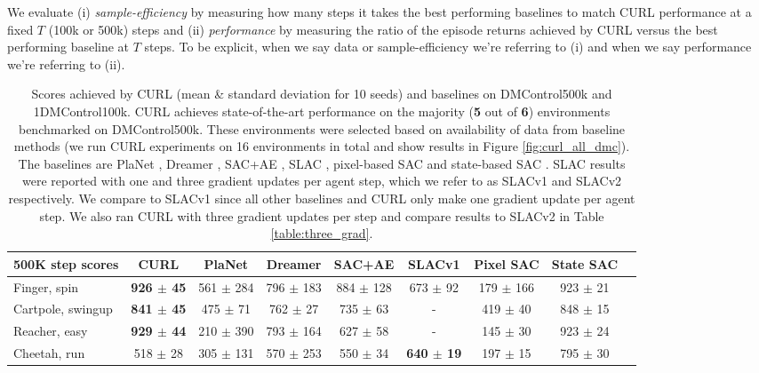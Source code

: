 \documentclass{article}
\begin{document}
We evaluate (i) \textit{sample-efficiency} by measuring how many steps it takes the best performing baselines to match CURL performance at a fixed $T$ (100k or 500k) steps and (ii) \textit{performance} by measuring the ratio of the episode returns achieved by CURL versus the best performing baseline at $T$ steps. To be explicit, when we say data or sample-efficiency we're referring to (i) and when we say performance we're referring to (ii).

\begin{table*}[ht]
\caption{Scores achieved by CURL (mean \& standard deviation for 10 seeds) and baselines on DMControl500k and 1DMControl100k. CURL achieves state-of-the-art performance on the majority (\textbf{5} out of \textbf{6}) environments benchmarked on DMControl500k. These environments were selected based on availability of data from baseline methods (we run CURL experiments on 16 environments in total and show results in Figure \ref{fig:curl_all_dmc}). The baselines are PlaNet \cite{hafner2018learning}, Dreamer \cite{hafner2019dream}, SAC+AE \cite{yarats2019improving}, SLAC \cite{lee2019stochastic}, pixel-based SAC and state-based SAC \cite{haarnoja2018soft}. SLAC results were reported with one and three gradient updates per agent step, which we refer to as SLACv1 and SLACv2 respectively. We compare to SLACv1 since all other baselines and CURL only make one gradient update per agent step. We also ran CURL with three gradient updates per step and compare results to SLACv2 in Table \ref{table:three_grad}.}
\label{table:500kscores}
\vskip 0.15in
\begin{center}
\begin{small}
\begin{sc}
\begin{tabular}{lcccccccc}
\toprule
500K step scores & CURL & PlaNet & Dreamer & SAC+AE & SLACv1 & Pixel SAC &  State SAC \\
\midrule
Finger, spin    & \textbf{ 926 $\pm$ 45} & 561 $\pm$ 284 & 796 $\pm$ 183  & 884 $\pm$ 128 &   673 $\pm$ 92 & 179 $\pm$ 166  & 923 $\pm$ 21 \\
Cartpole, swingup & \textbf{841 $\pm$ 45}& 475 $\pm$ 71& 762 $\pm$ 27 & 735 $\pm$ 63 & - & 419 $\pm$ 40 &  848 $\pm$ 15 \\
Reacher, easy    & \textbf{929 $\pm$ 44}& 210 $\pm$ 390& 793 $\pm$ 164 & 627 $\pm$ 58 & - & 145 $\pm$ 30 &  923 $\pm$ 24 \\
Cheetah, run   & 518 $\pm$ 28 & 305 $\pm$ 131& 570 $\pm$ 253 & 550 $\pm$ 34 &  \textbf{640 $\pm$ 19} & 197 $\pm$ 15 & 795 $\pm$ 30 \\

\end{tabular}
\end{sc}
\end{small}
\end{center}
\end{table*}
\end{document}
